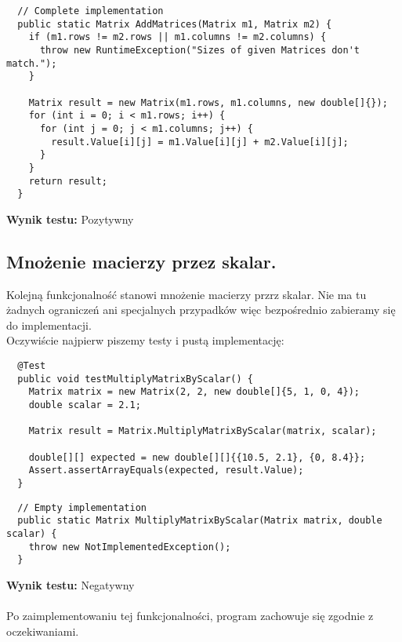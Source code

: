 \documentclass[a4paper,12pt,twoside]{article}
\begin{document}
\begin{lstlisting}
  // Complete implementation
  public static Matrix AddMatrices(Matrix m1, Matrix m2) {
    if (m1.rows != m2.rows || m1.columns != m2.columns) {
      throw new RuntimeException("Sizes of given Matrices don't match.");
    }

    Matrix result = new Matrix(m1.rows, m1.columns, new double[]{});
    for (int i = 0; i < m1.rows; i++) {
      for (int j = 0; j < m1.columns; j++) {
        result.Value[i][j] = m1.Value[i][j] + m2.Value[i][j];
      }
    }
    return result;
  }
\end{lstlisting}
\medskip

\noindent
\textbf{Wynik testu: }{\color{green} Pozytywny}


\subsection{Mnożenie macierzy przez skalar.}
\bigskip

Kolejną funkcjonalność stanowi mnożenie macierzy przrz skalar. Nie ma tu żadnych
ograniczeń ani specjalnych przypadków więc bezpośrednio zabieramy się do implementacji.\\

\noindent
Oczywiście najpierw piszemy testy i pustą implementację:

\begin{lstlisting}
  @Test
  public void testMultiplyMatrixByScalar() {
    Matrix matrix = new Matrix(2, 2, new double[]{5, 1, 0, 4});
    double scalar = 2.1;

    Matrix result = Matrix.MultiplyMatrixByScalar(matrix, scalar);

    double[][] expected = new double[][]{{10.5, 2.1}, {0, 8.4}};
    Assert.assertArrayEquals(expected, result.Value);
  }
\end{lstlisting}

\begin{lstlisting}
  // Empty implementation
  public static Matrix MultiplyMatrixByScalar(Matrix matrix, double scalar) {
    throw new NotImplementedException();
  }
\end{lstlisting}
\medskip

\noindent
\textbf{Wynik testu: }{\color{red} Negatywny}\\\\
Po zaimplementowaniu tej funkcjonalności, program
zachowuje się zgodnie z oczekiwaniami.\\
\end{document}
